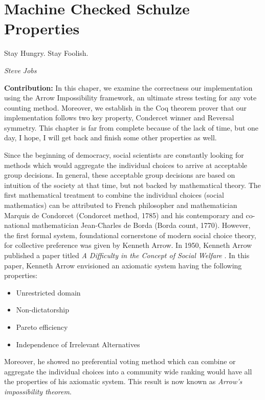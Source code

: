 \chapter{Machine Checked Schulze Properties}
\label{cha:machine_checked}

\epigraph{Stay Hungry. Stay Foolish.} 
{\textit{Steve Jobs}} 

\textbf{Contribution:} In this chaper,  we examine the correctness our implementation  
 using the Arrow Impossibility framework,  an ultimate stress testing for any vote counting method. 
 Moreover, we establish in the Coq theorem prover that our implementation 
 follows two key property, Condercet winner and Reversal symmetry.  This chapter is 
 far from complete because of the lack of time, but one day, I hope, I will get back and 
 finish some other properties as well. 


 Since the beginning of democracy, social scientists are constantly looking for methods  which would 
 aggregate the individual choices  to arrive at acceptable group decisions. 
 In general, these acceptable group decisions are based on intuition of the society at that time,
 but not backed by mathematical theory. The first mathematical 
 treatment to combine the individual choices (social mathematics)  can be 
 attributed to French philosopher and mathematician Marquis de Condorcet (Condorcet method, 1785) and his contemporary
 and co-national mathematician Jean-Charles de Borda (Borda count, 1770). However, the first formal system, foundational cornerstone
 of modern social choice theory, for collective preference was given by Kenneth Arrow. In 1950, Kenneth Arrow 
 published a paper titled \textit{A Difficulty in the Concept of Social Welfare} \citep{arrow1950difficulty}. 
 In this paper, Kenneth Arrow envisioned an axiomatic system having the following properties:
 
 \begin{itemize}
 \item Unrestricted domain
 \item Non-dictatorship
 \item Pareto efficiency
 \item Independence of Irrelevant Alternatives
 \end{itemize}
 
 Moreover, he showed no preferential voting method which can combine or aggregate the individual choices into a community wide 
 ranking would have all the properties of his axiomatic system. This result is now known as \textit{Arrow's impossibility theorem}. 


